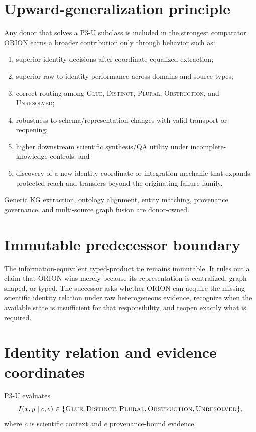 \documentclass[11pt]{article}
\begin{document}
\section{Upward-generalization principle}
Any donor that solves a P3-U subclass is included in the strongest comparator. ORION earns a broader contribution only through behavior such as:
\begin{enumerate}
    \item superior identity decisions after coordinate-equalized extraction;
    \item superior raw-to-identity performance across domains and source types;
    \item correct routing among \textsc{Glue}, \textsc{Distinct}, \textsc{Plural}, \textsc{Obstruction}, and \textsc{Unresolved};
    \item robustness to schema/representation changes with valid transport or reopening;
    \item higher downstream scientific synthesis/QA utility under incomplete-knowledge controls; and
    \item discovery of a new identity coordinate or integration mechanic that expands protected reach and transfers beyond the originating failure family.
\end{enumerate}
Generic KG extraction, ontology alignment, entity matching, provenance governance, and multi-source graph fusion are donor-owned.

\section{Immutable predecessor boundary}
The information-equivalent typed-product tie remains immutable. It rules out a claim that ORION wins merely because its representation is centralized, graph-shaped, or typed. The successor asks whether ORION can acquire the missing scientific identity relation under raw heterogeneous evidence, recognize when the available state is insufficient for that responsibility, and reopen exactly what is required.

\section{Identity relation and evidence coordinates}
P3-U evaluates
\[
I(x,y\mid c,e)\in\{\textsc{Glue},\textsc{Distinct},\textsc{Plural},\textsc{Obstruction},\textsc{Unresolved}\},
\]
where $c$ is scientific context and $e$ provenance-bound evidence.
\end{document}

